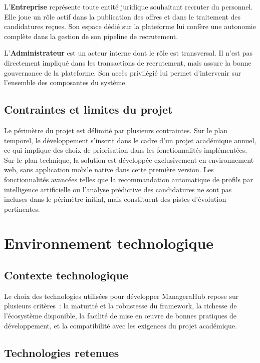 \documentclass[12pt,a4paper]{report}
\begin{document}
L'\textbf{Entreprise} représente toute entité juridique souhaitant recruter du personnel. Elle joue un rôle actif dans la publication des offres et dans le traitement des candidatures reçues. Son espace dédié sur la plateforme lui confère une autonomie complète dans la gestion de son pipeline de recrutement.

L'\textbf{Administrateur} est un acteur interne dont le rôle est transversal. Il n'est pas directement impliqué dans les transactions de recrutement, mais assure la bonne gouvernance de la plateforme. Son accès privilégié lui permet d'intervenir sur l'ensemble des composantes du système.

\subsection{Contraintes et limites du projet}

Le périmètre du projet est délimité par plusieurs contraintes. Sur le plan temporel, le développement s'inscrit dans le cadre d'un projet académique annuel, ce qui implique des choix de priorisation dans les fonctionnalités implémentées. Sur le plan technique, la solution est développée exclusivement en environnement web, sans application mobile native dans cette première version. Les fonctionnalités avancées telles que la recommandation automatique de profils par intelligence artificielle ou l'analyse prédictive des candidatures ne sont pas incluses dans le périmètre initial, mais constituent des pistes d'évolution pertinentes.

\section{Environnement technologique}

\subsection{Contexte technologique}

Le choix des technologies utilisées pour développer ManageraHub repose sur plusieurs critères~: la maturité et la robustesse du framework, la richesse de l'écosystème disponible, la facilité de mise en œuvre de bonnes pratiques de développement, et la compatibilité avec les exigences du projet académique.

\subsection{Technologies retenues}
\end{document}
